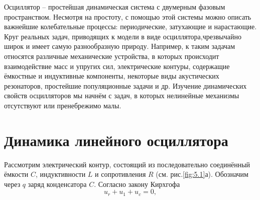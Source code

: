 Осциллятор – простейшая динамическая система с двумерным фазовым
пространством. Несмотря на простоту, с помощью этой системы можно описать
важнейшие колебательные процессы: периодические, затухающие и
нарастающие. Круг реальных задач, приводящих к модели в виде
осциллятора,чрезвычайно широк и имеет самую разнообразную природу.
Например, к таким задачам относятся различные механические устройства, в
которых происходит взаимодействие масс и упругих сил, электрические
контуры, содержащие ёмкостные и индуктивные компоненты, некоторые виды
акустических резонаторов, простейшие популяционные задачи и др. Изучение
динамических свойств осцилляторов мы начнём с задач, в которых нелинейные
механизмы отсутствуют или пренебрежимо малы.

\section{Динамика линейного осциллятора}%
\label{sec:5.1}

Рассмотрим электрический контур, состоящий из последовательно соединённый ёмкости $C$, индуктивности $L$ и сопротивления $R$ (см. рис.\ref{fig:5.1}а).
Обозначим через $q$ заряд конденсатора $C$. Согласно закону Кирхгофа
\begin{equation}
        \label{eq:5.1}
        u_r + u_1 + u_c =0,
\end{equation}

